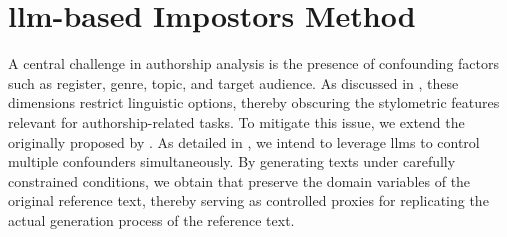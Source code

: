 \chapter{\acs{llm}-based Impostors Method}
\label{chap:llm_impostor_method}

A central challenge in authorship analysis is the presence of confounding factors such as register, genre, topic, and target audience. 
As discussed in , these dimensions restrict linguistic options, thereby obscuring the stylometric features relevant for authorship-related tasks. 
To mitigate this issue, we extend the \impAppr{} originally proposed by \citet{koppel_determining_2014}.
As detailed in , we intend to leverage \acp{llm} to control multiple confounders simultaneously.
By generating texts under carefully constrained conditions, we obtain \imps{} that preserve the domain variables of the original reference text, thereby serving as controlled proxies for replicating the actual generation process of the reference text.






